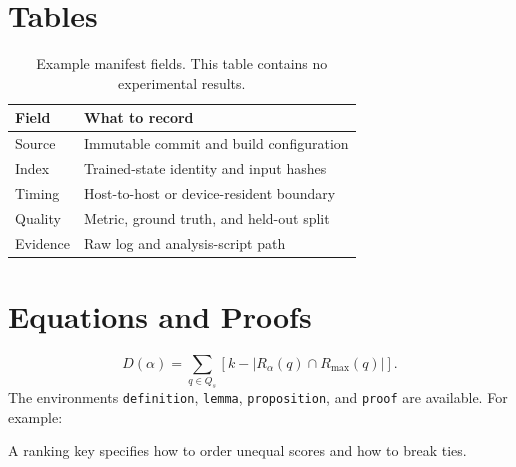 \section{Tables}
\begin{table}[tbp]
\centering
\caption{Example manifest fields. This table contains no experimental results.}
\label{tab:example-manifest}
\begin{tabularx}{\linewidth}{@{}lX@{}}
\toprule
Field & What to record \\
\midrule
Source & Immutable commit and build configuration \\
Index & Trained-state identity and input hashes \\
Timing & Host-to-host or device-resident boundary \\
Quality & Metric, ground truth, and held-out split \\
Evidence & Raw log and analysis-script path \\
\bottomrule
\end{tabularx}
\end{table}

\section{Equations and Proofs}
\begin{equation}
 D(\alpha)=\sum_{q\in Q_s}
  \left[k-\left|R_\alpha(q)\cap R_{\max}(q)\right|\right].
 \label{eq:example-disagreement}
\end{equation}
The environments \texttt{definition}, \texttt{lemma}, \texttt{proposition},
and \texttt{proof} are available. For example:
\begin{definition}
A ranking key specifies how to order unequal scores and how to break ties.
\end{definition}


